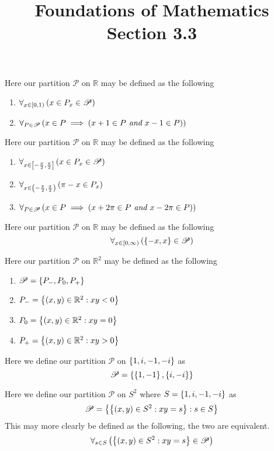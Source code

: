 \documentclass{article}
\title{Foundations of Mathematics \\ Section 3.3}
\begin{document}
\maketitle



Here our partition $\mathscr P$ on $\mathbb R$ may be defined as the following
\begin{enumerate}
\item $\forall_{x\in\left[ 0 , 1 \right)}\left( x \in P_x \in \mathscr P \right)$
\item $\forall_{P \in \mathscr P}\left( x \in P \implies \left( x + 1 \in P \textit{ and } x - 1 \in P \right) \right)$
\end{enumerate}

Here our partition $\mathscr P$ on $\mathbb R$ may be defined as the following
\begin{enumerate}
\item $\forall_{x \in \left[ -\frac\pi2 , \frac\pi2 \right]}\left( x \in P_x \in \mathscr P \right)$
\item $\forall_{x \in \left( -\frac\pi2 , \frac\pi2 \right)}\left( \pi-x \in P_x \right)$
\item $\forall_{P \in \mathscr P}\left( x \in P \implies \left( x + 2\pi \in P \textit{ and } x - 2\pi \in P \right) \right)$
\end{enumerate}


Here our partition $\mathscr P$ on $\mathbb R$ may be defined as the following
\[
\forall_{x\in\left[ 0 , \infty \right)}\left( \left\{ {-x,x} \right\}\in\mathscr P \right)
\]


Here our partition $\mathscr P$ on $\mathbb R^2$ may be defined as the following
\begin{enumerate}
\item $\mathscr P = \left\{ {P_-, P_0, P_+} \right\}$
\item $P_- = \left\{ {\left( x , y \right) \in \mathbb R^2 : xy < 0} \right\}$
\item $P_0 = \left\{ {\left( x , y \right) \in \mathbb R^2 : xy = 0} \right\}$
\item $P_+ = \left\{ {\left( x , y \right) \in \mathbb R^2 : xy > 0} \right\}$
\end{enumerate}


Here we define our partition $\mathscr P$ on $\left\{ {1,i,-1,-i} \right\}$ as
\[\mathscr P = \left\{ {\left\{ {1,-1} \right\},\left\{ {i,-i} \right\}} \right\}\]


Here we define our partition $\mathscr P$ on $S^2$ where $S = \left\{ {1,i,-1,-i} \right\}$ as
\[\mathscr P = \left\{ {\left\{ {\left( x , y \right)\in S^2 : xy = s} \right\} : s\in S} \right\}\]
This may more clearly be defined as the following, the two are equivalent.
\[\forall_{s\in S}\left( \left\{ {\left( x , y \right)\in S^2 : xy = s} \right\} \in \mathscr P \right)\]
\end{document}
